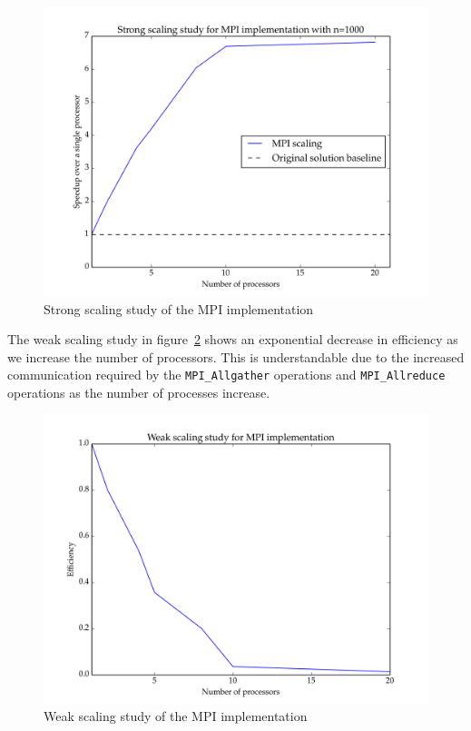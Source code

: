\documentclass[11pt]{article}
\begin{document}
\begin{figure}[H]
\centering
\includegraphics[scale=0.5]{./scaling_studies/strong_scaling_mpi.png}
\caption{Strong scaling study of the MPI implementation}
\label{fig:ss_mpi}
\end{figure}

The weak scaling study in figure~\ref{fig:ws_mpi} shows an exponential decrease in efficiency as we increase the number of processors. This is understandable due to the increased communication required by the \texttt{MPI\_Allgather} operations and \texttt{MPI\_Allreduce} operations as the number of processes increase. 

\begin{figure}[H]
\centering
\includegraphics[scale=0.5]{./scaling_studies/weak_scaling_mpi.png}
\caption{Weak scaling study of the MPI implementation}
\label{fig:ws_mpi}
\end{figure}
\end{document}
